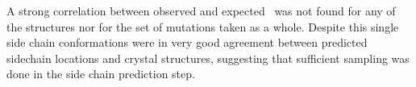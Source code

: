 A strong correlation between observed and expected \ddg\ was not found for any of the structures nor for the set of mutations taken as a whole.
Despite this single side chain conformations were in very good agreement between predicted sidechain locations and crystal structures, suggesting that sufficient sampling was done in the side chain prediction step.

